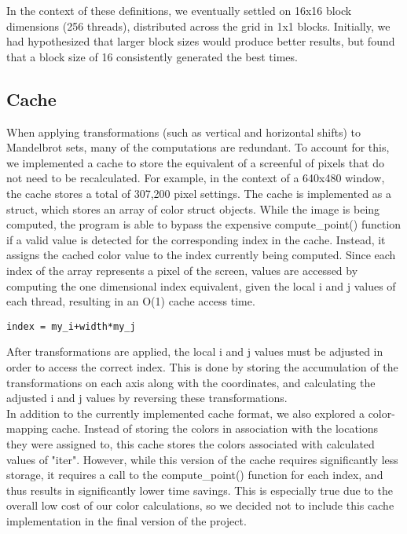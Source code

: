 \documentclass{article}
\begin{document}
In the context of these definitions, we eventually settled on 16x16 block dimensions (256 threads), distributed across the grid in 1x1 blocks.
Initially, we had hypothesized that larger block sizes would produce better results, but found that a block size of 16 consistently generated the best times.

\subsection{Cache}

When applying transformations (such as vertical and horizontal shifts) to Mandelbrot sets, many of the computations are redundant.
To account for this, we implemented a cache to store the equivalent of a screenful of pixels that do not need to be recalculated.
For example, in the context of a 640x480 window, the cache stores a total of 307,200 pixel settings.
The cache is implemented as a struct, which stores an array of color struct objects.
While the image is being computed, the program is able to bypass the expensive compute\_point() function if a valid value is detected for the corresponding index in the cache.
Instead, it assigns the cached color value to the index currently being computed.
Since each index of the array represents a pixel of the screen, values are accessed by computing the one dimensional index equivalent, given the local i and j values of each thread, resulting in an O(1) cache access time.

\begin{verbatim}
index = my_i+width*my_j
\end{verbatim}

After transformations are applied, the local i and j values must be adjusted in order to access the correct index.
This is done by storing the accumulation of the transformations on each axis along with the coordinates, and calculating the adjusted i and j values by reversing these transformations.\\

In addition to the currently implemented cache format, we also explored a color-mapping cache.
Instead of storing the colors in association with the locations they were assigned to, this cache stores the colors associated with calculated values of "iter".
However, while this version of the cache requires significantly less storage, it requires a call to the compute\_point() function for each index, and thus results in significantly lower time savings.
This is especially true due to the overall low cost of our color calculations, so we decided not to include this cache implementation in the final version of the project.
\end{document}
